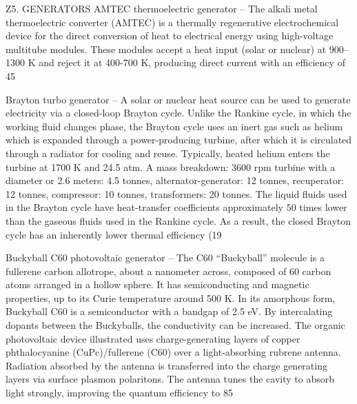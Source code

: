 \documentclass[a4paper]{book}
\begin{document}
Z5. GENERATORS
AMTEC thermoelectric generator – The alkali metal thermoelectric converter (AMTEC) is a thermally regenerative electrochemical device for the direct conversion of heat to electrical energy using high-voltage multitube modules. These modules accept a heat input (solar or nuclear) at 900–1300 K and reject it at 400-700 K, producing direct current with an efficiency of 45%
 
Brayton turbo generator – A solar or nuclear heat source can be used to generate electricity via a closed-loop Brayton cycle. Unlike the Rankine cycle, in which the working fluid changes phase, the Brayton cycle uses an inert gas such as helium which is expanded through a power-producing turbine, after which it is circulated through a radiator for cooling and reuse.  Typically, heated helium enters the turbine at 1700 K and 24.5 atm. A mass breakdown: 3600 rpm turbine with a diameter or 2.6 meters: 4.5 tonnes, alternator-generator: 12 tonnes, recuperator: 12 tonnes, compressor: 10 tonnes, transformers: 20 tonnes. The liquid fluids used in the Brayton cycle have heat-transfer coefficients approximately 50 times lower than the gaseous fluids used in the Rankine cycle. As a result, the closed Brayton cycle has an inherently lower thermal efficiency (19%
 
Buckyball C60 photovoltaic generator – The C60 “Buckyball” molecule is a fullerene carbon allotrope, about a nanometer across, composed of 60 carbon atoms arranged in a hollow sphere. It has semiconducting and magnetic properties, up to its Curie temperature around 500 K.  In its amorphous form, Buckyball C60 is a semiconductor with a bandgap of 2.5 eV. By intercalating dopants between the Buckyballs, the conductivity can be increased. The organic photovoltaic device illustrated uses charge-generating layers of copper phthalocyanine (CuPc)/fullerene (C60) over a light-absorbing rubrene antenna. Radiation absorbed by the antenna is transferred into the charge generating layers via surface plasmon polaritons. The antenna tunes the cavity to absorb light strongly, improving the quantum efficiency to 85%
 
\end{document}
